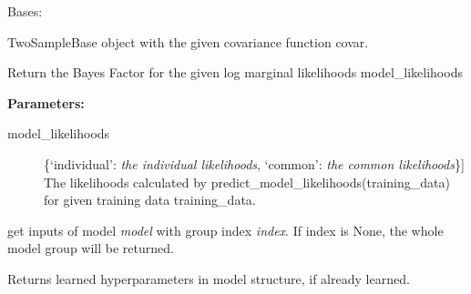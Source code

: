 \documentclass[letterpaper,10pt]{sphinxmanual}
\begin{document}

\begin{fulllineitems}
\label{base:gptwosample.twosample.twosample_base.TwoSampleBase}
Bases: 

TwoSampleBase object with the given covariance function covar.

\begin{fulllineitems}
\label{base:gptwosample.twosample.twosample_base.TwoSampleBase.bayes_factor}
Return the Bayes Factor for the given log marginal likelihoods model\_likelihoods

\textbf{Parameters:}
\begin{description}
\item[{model\_likelihoods}] \leavevmode{[}\{`individual': \emph{the individual likelihoods}, `common': \emph{the common likelihoods}\}{]}
The likelihoods calculated by
predict\_model\_likelihoods(training\_data)
for given training data training\_data.

\end{description}

\end{fulllineitems}


\begin{fulllineitems}
\label{base:gptwosample.twosample.twosample_base.TwoSampleBase.get_data}
get inputs of model \emph{model} with group index \emph{index}.
If index is None, the whole model group will be returned.

\end{fulllineitems}


\begin{fulllineitems}
\label{base:gptwosample.twosample.twosample_base.TwoSampleBase.get_learned_hyperparameters}
Returns learned hyperparameters in model structure, if already learned.


\end{fulllineitems}
\end{fulllineitems}
\end{document}
